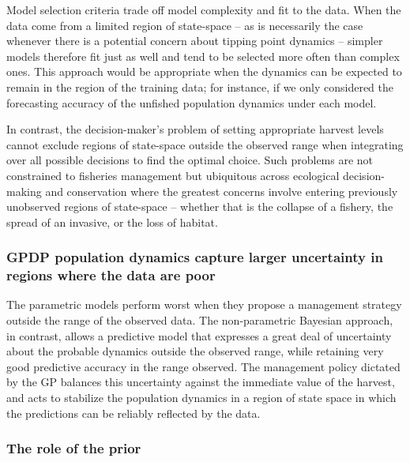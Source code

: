 \documentclass[author-year, 12pt,review]{components/elsarticle} %
\begin{document}
Model selection criteria trade off model complexity and fit to the data.
When the data come from a limited region of state-space -- as is
necessarily the case whenever there is a potential concern about tipping
point dynamics -- simpler models therefore fit just as well and tend to
be selected more often than complex ones. This approach would be
appropriate when the dynamics can be expected to remain in the region of
the training data; for instance, if we only considered the forecasting
accuracy of the unfished population dynamics under each model.

In contrast, the decision-maker's problem of setting appropriate harvest
levels cannot exclude regions of state-space outside the observed range
when integrating over all possible decisions to find the optimal choice.
Such problems are not constrained to fisheries management but ubiquitous
across ecological decision-making and conservation where the greatest
concerns involve entering previously unobserved regions of state-space
-- whether that is the collapse of a fishery, the spread of an invasive,
or the loss of habitat.

\subsubsection{GPDP population dynamics capture larger uncertainty in
regions where the data are
poor}\label{gpdp-population-dynamics-capture-larger-uncertainty-in-regions-where-the-data-are-poor}

The parametric models perform worst when they propose a management
strategy outside the range of the observed data. The non-parametric
Bayesian approach, in contrast, allows a predictive model that expresses
a great deal of uncertainty about the probable dynamics outside the
observed range, while retaining very good predictive accuracy in the
range observed. The management policy dictated by the GP balances this
uncertainty against the immediate value of the harvest, and acts to
stabilize the population dynamics in a region of state space in which
the predictions can be reliably reflected by the data.

\subsubsection{The role of the prior}\label{the-role-of-the-prior}
\end{document}
